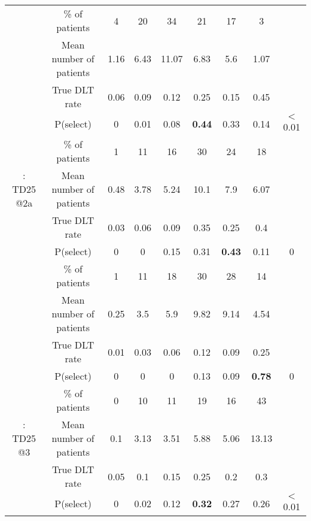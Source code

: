 \begin{table}[h!]
\begin{singlespace}
{\begin{tabular}[t]{ccccccccc}
				\rowcolor{gray!6}   & \% of patients & 4 & 20 & 34 & 21 & 17 & 3 & \\
				
				\rowcolor{gray!6}  \multirow{-4}{*}{\centering\arraybackslash 11: TD25 @1} & Mean number of patients & 1.16 & 6.43 & 11.07 & 6.83 & 5.6 & 1.07 & \\
				\cmidrule{1-9}
				& True DLT rate & 0.06 & 0.09 & 0.12 & 0.25 & 0.15 & 0.45 & \\
				
				& P(select) & 0 & 0.01 & 0.08 & \textbf{0.44} & 0.33 & 0.14 & $<$0.01\\
				
				& \% of patients & 1 & 11 & 16 & 30 & 24 & 18 & \\
				
				\multirow{-4}{*}{\centering\arraybackslash 12: TD25 @2a} & Mean number of patients & 0.48 & 3.78 & 5.24 & 10.1 & 7.9 & 6.07 & \\
				\cmidrule{1-9}
				\rowcolor{gray!6}   & True DLT rate & 0.03 & 0.06 & 0.09 & 0.35 & 0.25 & 0.4 & \\
				
				\rowcolor{gray!6}   & P(select) & 0 & 0 & 0.15 & 0.31 & \textbf{0.43} & 0.11 & 0\\
				
				\rowcolor{gray!6}   & \% of patients & 1 & 11 & 18 & 30 & 28 & 14 & \\
				
				\rowcolor{gray!6}  \multirow{-4}{*}{\centering\arraybackslash 13: TD25 @2b} & Mean number of patients & 0.25 & 3.5 & 5.9 & 9.82 & 9.14 & 4.54 & \\
				\cmidrule{1-9}
				& True DLT rate & 0.01 & 0.03 & 0.06 & 0.12 & 0.09 & 0.25 & \\
				
				& P(select) & 0 & 0 & 0 & 0.13 & 0.09 & \textbf{0.78} & 0\\
				
				& \% of patients & 0 & 10 & 11 & 19 & 16 & 43 & \\
				
				\multirow{-4}{*}{\centering\arraybackslash 14: TD25 @3} & Mean number of patients & 0.1 & 3.13 & 3.51 & 5.88 & 5.06 & 13.13 & \\
				\cmidrule{1-9}
				\rowcolor{gray!6}   & True DLT rate & 0.05 & 0.1 & 0.15 & 0.25 & 0.2 & 0.3 & \\
				
				\rowcolor{gray!6}   & P(select) & 0 & 0.02 & 0.12 & \textbf{0.32} & 0.27 & 0.26 & $<$0.01\\
				

\end{tabular}}
\end{singlespace}
\end{table}
